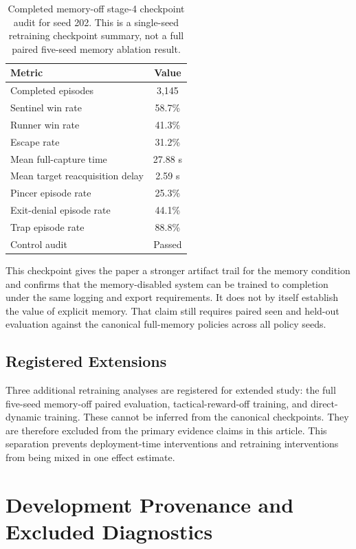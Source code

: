 \documentclass[journal]{IEEEtran}
\begin{document}
\begin{table}[t]
\centering
\caption{Completed memory-off stage-4 checkpoint audit for seed 202. This is a
single-seed retraining checkpoint summary, not a full paired five-seed memory
ablation result.}
\label{tab:memory_off_checkpoint}
\footnotesize
\begin{tabular}{lc}
\toprule
Metric & Value \\
\midrule
Completed episodes & 3,145 \\
Sentinel win rate & 58.7\% \\
Runner win rate & 41.3\% \\
Escape rate & 31.2\% \\
Mean full-capture time & 27.88 s \\
Mean target reacquisition delay & 2.59 s \\
Pincer episode rate & 25.3\% \\
Exit-denial episode rate & 44.1\% \\
Trap episode rate & 88.8\% \\
Control audit & Passed \\
\bottomrule
\end{tabular}
\end{table}

This checkpoint gives the paper a stronger artifact trail for the memory
condition and confirms that the memory-disabled system can be trained to
completion under the same logging and export requirements. It does not by
itself establish the value of explicit memory. That claim still requires paired
seen and held-out evaluation against the canonical full-memory policies across
all policy seeds.

\subsection{Registered Extensions}

Three additional retraining analyses are registered for extended study: the
full five-seed memory-off paired evaluation, tactical-reward-off training, and
direct-dynamic training. These cannot be inferred from the canonical
checkpoints. They are therefore excluded from the primary evidence claims in
this article. This separation prevents deployment-time interventions and
retraining interventions from being mixed in one effect estimate.

\section{Development Provenance and Excluded Diagnostics}
\end{document}
